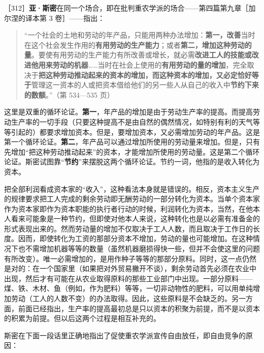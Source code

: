 ［312］\fontbox{~\{}\textbf{亚·斯密}在同一个场合，即在批判重农学派的场合——第四篇第九章［加尔涅的译本第 3 卷］——指出：

\begin{quote}“一个社会的土地和劳动的年产品，只能用两种办法增加：\textbf{第一，改善}当时在这个社会发生作用的\textbf{有用劳动的生产能力}；或者\textbf{第二，增加这种劳动的量}。要使有用劳动的生产能力有所改善或增长，就必需\textbf{改进工人的技能或改进他用来劳动的机器}……当时在社会上使用的\textbf{有用劳动的量的增加}，完全取决于\textbf{把这种劳动推动起来的资本的增加，而这种资本的增加，又必定恰好等于}管理这一资本的人或把资本借给他们的另一些人从自己的收入中\textbf{节约下来的数额}。”（第 534—535 页）\end{quote}

这里是双重的循环论证。\textbf{第一}，年产品的增加是由于劳动生产率的提高。而提高劳动生产率的一切手段（只要这种提高不是由自然的偶然情况，如特别有利的天气等等引起的）都要求增加资本。但是，要增加资本，又必需增加劳动的年产品。这是第一个循环论证。\textbf{第二}，年产品可以通过增加所使用的劳动量来增加。但是，只有先增加“把这种劳动推动起来”的资本，才能增加所使用的劳动量。这是第二个循环论证。斯密试图靠“\textbf{节约}”来摆脱这两个循环论证。节约一词，他指的是收入转化为资本。

把全部利润看成资本家的“收入”，这种看法本身就是错误的。相反，资本主义生产的规律要求把工人完成的剩余劳动即无酬劳动的一部分转化为资本。当单个资本家作为资本家即作为资本职能的执行者行动的时候，利润转化为资本，当然，在他本人看来可能象是一种节约，但即使对他本人来说，这种转化也是以必需有准备金的形式表现出来的。然而劳动量的增加不仅取决于工人人数，而且取决于工作日的长度。因而，即使转化为工资的那部分资本不增加，劳动的量也可能增加。在这种情况下也不需增加机器等等的数量（虽然机器磨损得快一些，但并不会使这里的问题有所改变）。唯一必需增加的，是用作种子等等的那部分原料。同时，这一点仍然是对的：在一个国家里（如果把对外贸易撇开不谈），剩余劳动首先必须在农业中出现，然后才有可能在从农业取得原料的那些工业部门中出现。一部分原料——煤、铁、木材、鱼（例如，作为肥料）等等，一切非动物性的肥料，可以用单纯增加劳动（工人的人数不变）的办法取得。因此，这些原料是不会缺乏的。另一方面，前面已经指出，生产率的提高最初总是只以资本的积聚为前提，而不是以资本的积累为前提。但以后这两个过程是相互补充的。\fontbox{\}~}

\fontbox{~\{}斯密在下面一段话里正确地指出了促使重农学派宣传自由放任，即自由竞争的原因：

